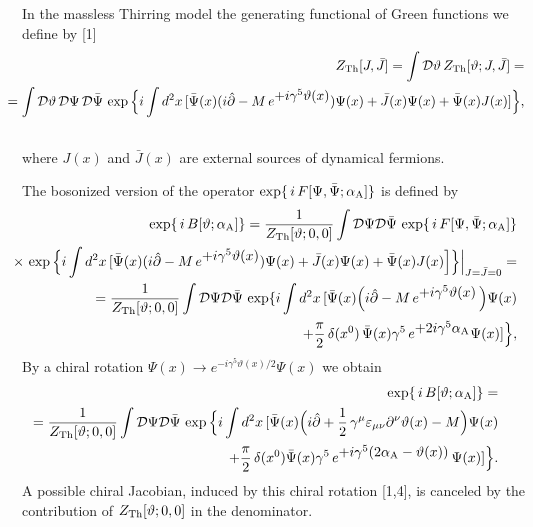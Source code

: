 \documentclass[a4paper,12pt] {article}
\begin{document}
In the massless Thirring model the generating functional of Green
functions we define by [1]
%
\begin{eqnarray}\label{label14}
\hspace{-0.3in}&&Z_{\rm Th}[J,\bar{J}] =\int {\cal D}\vartheta\,Z_{\rm
Th}[\vartheta; J,\bar{J}] = \nonumber\\
\hspace{-0.3in}&&= \int {\cal D}\vartheta\,{\cal D}\Psi\,{\cal
D}\bar{\Psi}\,\exp\Big\{i\int d^2x\,[\bar{\Psi}(x)(i\hat{\partial} -
M\,e^{\textstyle +i\gamma^5\vartheta(x)})\Psi(x) + \bar{J}(x)\Psi(x) +
\bar{\Psi}(x)J(x)]\Big\},\nonumber\\
\hspace{-0.3in}&& 
\end{eqnarray}
%
where $J(x)$ and $\bar{J}(x)$ are external sources of dynamical
fermions.

The bosonized version of the operator $\exp\{\,i\,F[\Psi,
\bar{\Psi};\alpha_{\rm A}]\}$ is defined by
%
\begin{eqnarray}\label{label15}
\hspace{-0.3in}&&\exp\{\,i\,B[\vartheta; \alpha_{\rm A}]\} =
\frac{1}{Z_{\rm Th}[\vartheta; 0,0]}\int {\cal D}\Psi {\cal
D}\bar{\Psi}\,\exp\{\,i\,F[\Psi, \bar{\Psi};\alpha_{\rm
A}]\}\nonumber\\
\hspace{-0.3in}&&\times\,\exp\Big\{i\int
d^2x\,[\bar{\Psi}(x)(i\hat{\partial} - M\,e^{\textstyle
+i\gamma^5\vartheta(x)})\Psi(x)+ \bar{J}(x)\Psi(x) +
\bar{\Psi}(x)J(x)\Big]\Big\}\Big|_{J = \bar{J} = 0}=\nonumber\\
\hspace{-0.3in}&& = \frac{1}{Z_{\rm Th}[\vartheta; 0,0]}\int {\cal
D}\Psi{\cal D}\bar{\Psi}\,\exp\{i\int
d^2x\,[\bar{\Psi}(x)\Big(i\hat{\partial} - M\,e^{\textstyle
+i\gamma^5\vartheta(x)}\,\Big)\Psi(x)\nonumber\\
\hspace{-0.3in}&& +
\frac{\pi}{2}\,\delta(x^0)\,\bar{\Psi}(x)\gamma^5\,e^{\textstyle
+2i\gamma^5\alpha_{\rm A}}\Psi(x)]\Big\},
\end{eqnarray}
%
By a chiral rotation $\Psi(x) \to e^{\textstyle
-i\gamma^5\vartheta(x)/2}\Psi(x)$ we obtain
%
\begin{eqnarray}\label{label16}
\hspace{-0.3in}&&\exp\{\,i\,B[\vartheta; \alpha_{\rm A}]\} =
\nonumber\\
\hspace{-0.3in}&& = \frac{1}{Z_{\rm Th}[\vartheta; 0,0]}\int {\cal
D}\Psi{\cal D}\bar{\Psi}\,\exp\Big\{i\int d^2x\,[\bar{\Psi}(x)
\Big(i\hat{\partial} + \frac{1}{2}\,\gamma^{\mu} \varepsilon_{\mu\nu}
\partial^{\nu}\vartheta(x) - M\Big)\Psi(x)\nonumber\\
\hspace{-0.3in}&& +
\frac{\pi}{2}\,\delta(x^0)\bar{\Psi}(x)\gamma^5\,e^{\textstyle
+i\gamma^5(2\alpha_{\rm A} - \vartheta(x))}\,\Psi(x)]\Big\}.
\end{eqnarray}
%
A possible chiral Jacobian, induced by this chiral rotation [1,4], is
canceled by the contribution of $Z_{\rm Th}[\vartheta; 0,0]$ in the
denominator. 
\end{document}
